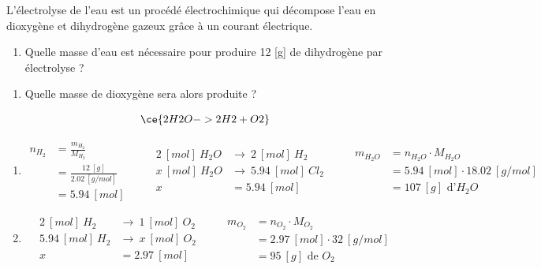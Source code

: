 \documentclass[
  11pt,
  french,
  a4paper,
  openany]{book}
\providecommand{\tightlist}{%
  \setlength{\itemsep}{0pt}\setlength{\parskip}{0pt}}
\begin{document}
\begin{Exercise}

L'électrolyse de l'eau est un procédé électrochimique qui décompose l'eau en dioxygène et dihydrogène gazeux grâce à un courant électrique.

\begin{enumerate}
\def\labelenumi{\arabic{enumi}.}
\tightlist
\item
  Quelle masse d'eau est nécessaire pour produire 12 {[}g{]} de dihydrogène par électrolyse ?
\end{enumerate}


\begin{enumerate}
\def\labelenumi{\arabic{enumi}.}
\setcounter{enumi}{1}
\tightlist
\item
  Quelle masse de dioxygène sera alors produite ?
\end{enumerate}



\end{Exercise}

\begin{Answer}

\[ \ce{2 H2O -> 2 H2 + O2} \]

\begin{enumerate}
\def\labelenumi{\arabic{enumi}.}
\item
  \[ \begin{split}
    n_{H_{2}} &= \frac{m_{H_{2}}}{M_{H_{2}}} \\
    &= \frac{12\ [g]}{2.02\ [g/mol]} \\
    &= 5.94\ [mol]
    \end{split}
    \qquad
    \begin{split}
    2\ [mol]\ H_2O &\rightarrow\ 2\ [mol]\ H_2 \\
    x\ [mol]\ H_2O &\rightarrow\ 5.94\ [mol]\ Cl_2 \\
    x &= 5.94\ [mol]
    \end{split}
    \qquad
    \begin{split}
    m_{H_2O} &= n_{H_2O} \cdot M_{H_2O} \\
    &= 5.94\ [mol] \cdot 18.02\ [g/mol] \\
    &= 107\ [g] \text{ d'} H_2O
    \end{split} \]
\item
  \[ \begin{split}
    2\ [mol]\ H_2 &\rightarrow\ 1\ [mol]\ O_2 \\
    5.94\ [mol]\ H_2 &\rightarrow\ x\ [mol]\ O_2 \\
    x &= 2.97\ [mol]
    \end{split}
    \qquad
    \begin{split}
    m_{O_2} &= n_{O_2} \cdot M_{O_2} \\
    &= 2.97\ [mol] \cdot 32\ [g/mol] \\
    &= 95\ [g] \text{ de } O_2
    \end{split} \]
\end{enumerate}


\end{Answer}
\end{document}
